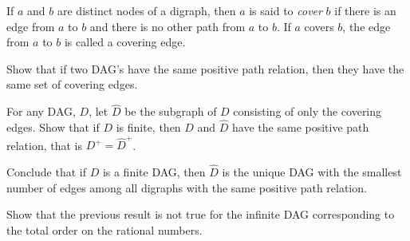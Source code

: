 \begin{notesproblem}
If $a$ and $b$ are distinct nodes of a digraph, then $a$ is said to
\emph{cover} $b$ if there is an edge from $a$ to $b$ and there is no other
path from $a$ to $b$.  If $a$ covers $b$, the edge from $a$ to $b$ is
called a covering edge.

\bparts

\ppart Show that if two DAG's have the same positive path relation, then
they have the same set of covering edges.

\ppart For any DAG, $D$, let $\widehat{D}$ be the subgraph of $D$
consisting of only the covering edges.  Show that if $D$ is finite, then
$D$ and $\widehat{D}$ have the same positive path relation, that is $D^+ =
\widehat{D}^+$.
 
\ppart Conclude that if $D$ is a finite DAG, then $\widehat{D}$ is the
unique DAG with the smallest number of edges among all digraphs with the same
positive path relation.

\ppart Show that the previous result is not true for the infinite DAG
corresponding to the total order on the rational numbers.


\eparts
\end{notesproblem}

\endinput
